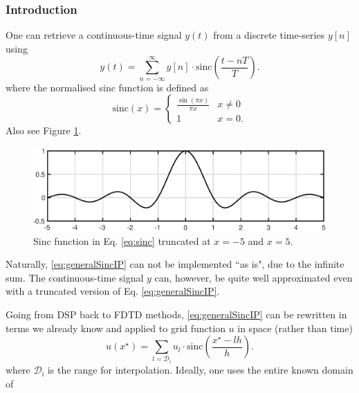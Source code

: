 \documentclass[dvipsnames]{article}
\begin{document}
\subsubsection{Introduction}
One can retrieve a continuous-time signal $y(t)$ from a discrete time-series $y[n]$ using 
\begin{equation}\label{eq:generalSincIP}
    y(t) = \sum_{n = -\infty}^{\infty} y[n] \cdot \text{sinc}\left(\frac{t - nT}{T}\right).
\end{equation}
where the normalised sinc function is defined as
\begin{equation}\label{eq:sinc}
    \text{sinc}(x) = \begin{cases}
        \frac{\sin(\pi x)}{\pi x} & x\neq 0\\
        1 & x = 0.
    \end{cases}
\end{equation}
Also see Figure \ref{fig:sinc}.
\begin{figure}[h]
\centerline{\includegraphics[width=0.6\columnwidth]{sincFig.eps} }
\caption{\label{fig:sinc}{Sinc function in Eq. \eqref{eq:sinc} truncated at $x = -5$ and $x = 5$.}}
\end{figure}


Naturally, \eqref{eq:generalSincIP} can not be implemented ``as is", due to the infinite sum. The continuous-time signal $y$ can, however, be quite well approximated even with a truncated version of Eq. \eqref{eq:generalSincIP}.

Going from DSP back to FDTD methods, \eqref{eq:generalSincIP} can be rewritten in terms we already know and applied to grid function $u$ in space (rather than time)
\begin{equation}\label{eq:FDSSinc}
    u(x^\star) = \sum_{l = \mathcal{D}_\text{i}} u_l \cdot \text{sinc}\left(\frac{x^\star - lh}{h}\right).
\end{equation}
where $\mathcal{D}_\text{i}$ is the range for interpolation. Ideally, one uses the entire known domain of 
\end{document}
